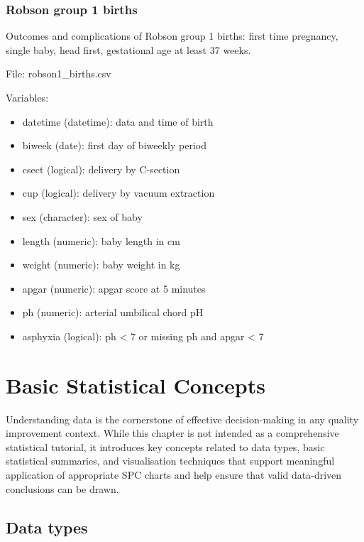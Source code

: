 \documentclass[
]{book}
\providecommand{\tightlist}{%
  \setlength{\itemsep}{0pt}\setlength{\parskip}{0pt}}
\begin{document}
\subsection*{Robson group 1 births}\label{robson-group-1-births}

Outcomes and complications of Robson group 1 births: first time
pregnancy, single baby, head first, gestational age at least 37 weeks.

File: robson1\_births.csv

Variables:

\begin{itemize}
\tightlist
\item
  datetime (datetime): data and time of birth
\item
  biweek (date): first day of biweekly period
\item
  csect (logical): delivery by C-section
\item
  cup (logical): delivery by vacuum extraction
\item
  sex (character): sex of baby
\item
  length (numeric): baby length in cm
\item
  weight (numeric): baby weight in kg
\item
  apgar (numeric): apgar score at 5 minutes
\item
  ph (numeric): arterial umbilical chord pH
\item
  asphyxia (logical): ph \textless{} 7 or missing ph and apgar \textless{} 7
\end{itemize}

\chapter{Basic Statistical Concepts}\label{stat-concepts}

Understanding data is the cornerstone of effective decision-making in any quality improvement context. While this chapter is not intended as a comprehensive statistical tutorial, it introduces key concepts related to data types, basic statistical summaries, and visualisation techniques that support meaningful application of appropriate SPC charts and help ensure that valid data-driven conclusions can be drawn.

\section{Data types}\label{data-types}
\end{document}
